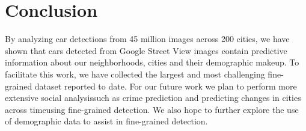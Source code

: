 \documentclass[10pt,twocolumn,letterpaper]{article}
\begin{document}
\section{Conclusion}
By analyzing car detections from 45 million images across 200 cities, we have shown that cars detected from Google Street View images contain predictive information about our neighborhoods, cities and their demographic makeup. To facilitate this work, we have collected the largest and most challenging fine-grained dataset reported to date. For our future work we plan to perform more extensive social analysis\textemdash such as crime prediction and predicting changes in cities across time\textemdash using fine-grained detection. We also hope to further explore the use of demographic data to assist in fine-grained detection. 
{\small


}
\end{document}
